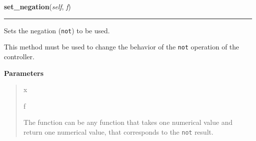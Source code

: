     \begin{boxedminipage}{\textwidth}

    \raggedright \textbf{set\_negation}(\textit{self}, \textit{f})

    \vspace{-1.5ex}

    \rule{\textwidth}{0.5\fboxrule}

Sets the negation (\texttt{not}) to be used.

This method must be used to change the behavior of the \texttt{not} operation
of the controller.
    \vspace{1ex}

      \textbf{Parameters}
      \begin{quote}
        \begin{Ventry}{x}

          \item[f]


The function can be any function that takes one numerical value and
return one numerical value, that corresponds to the \texttt{not} result.
        \end{Ventry}

      \end{quote}

    \vspace{1ex}

    \end{boxedminipage}

    \label{peach:fuzzy:control:Controller:set_implication}

    \vspace{0.5ex}

